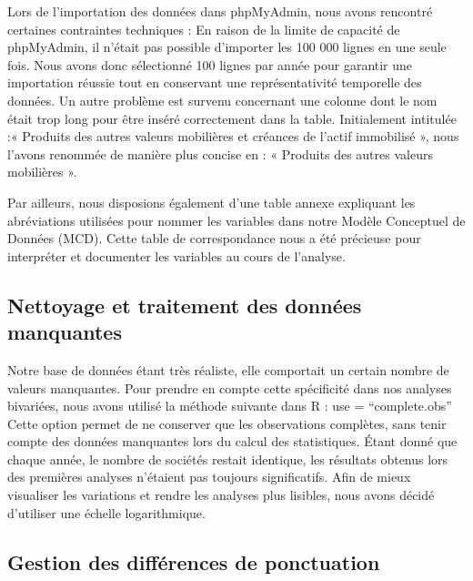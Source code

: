\documentclass[mstat,12pt]{unswthesis}
\begin{document}
\medskip

Lors de l'importation des données dans phpMyAdmin, nous avons rencontré
certaines contraintes techniques : En raison de la limite de capacité de
phpMyAdmin, il n'était pas possible d'importer les 100 000 lignes en une
seule fois. Nous avons donc sélectionné 100 lignes par année pour
garantir une importation réussie tout en conservant une représentativité
temporelle des données. Un autre problème est survenu concernant une
colonne dont le nom était trop long pour être inséré correctement dans
la table. Initialement intitulée :« Produits des autres valeurs
mobilières et créances de l'actif immobilisé », nous l'avons renommée de
manière plus concise en : « Produits des autres valeurs mobilières ».

\medskip

Par ailleurs, nous disposions également d'une table annexe expliquant
les abréviations utilisées pour nommer les variables dans notre Modèle
Conceptuel de Données (MCD). Cette table de correspondance nous a été
précieuse pour interpréter et documenter les variables au cours de
l'analyse.

\medskip

\subsection{Nettoyage et traitement des données
manquantes}\label{nettoyage-et-traitement-des-donnuxe9es-manquantes}

\medskip

Notre base de données étant très réaliste, elle comportait un certain
nombre de valeurs manquantes. Pour prendre en compte cette spécificité
dans nos analyses bivariées, nous avons utilisé la méthode suivante dans
R : use = ``complete.obs'' Cette option permet de ne conserver que les
observations complètes, sans tenir compte des données manquantes lors du
calcul des statistiques. Étant donné que chaque année, le nombre de
sociétés restait identique, les résultats obtenus lors des premières
analyses n'étaient pas toujours significatifs. Afin de mieux visualiser
les variations et rendre les analyses plus lisibles, nous avons décidé
d'utiliser une échelle logarithmique. \medskip

\subsection{Gestion des différences de
ponctuation}\label{gestion-des-diffuxe9rences-de-ponctuation}
\end{document}
